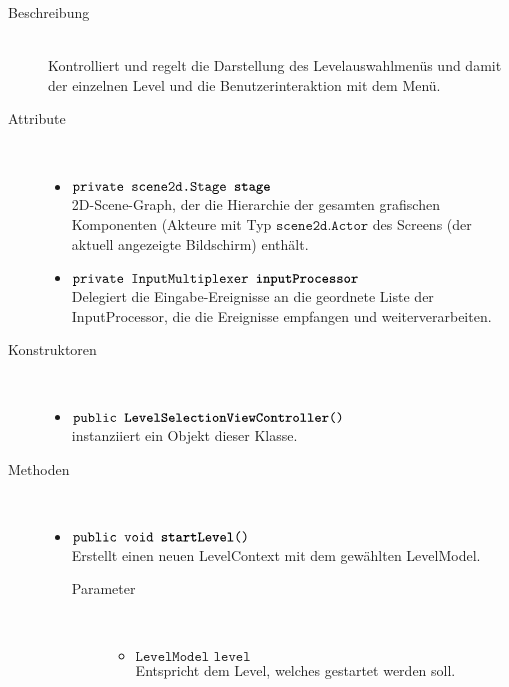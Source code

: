 \begin{description}
\item[Beschreibung] \hfill \\ Kontrolliert und regelt die Darstellung des Levelauswahlmenüs und damit der einzelnen Level und die Benutzerinteraktion mit dem Menü.
\item[Attribute] \hfill \\
	\vspace{-.8cm}
	\begin{itemize}	
		\item $\texttt{private scene2d.Stage \textbf{stage}}$ \\ 2D-Scene-Graph, der die Hierarchie der gesamten grafischen Komponenten (Akteure mit Typ $\texttt{scene2d.Actor}$ des Screens (der aktuell angezeigte Bildschirm) enthält. 
		\item $\texttt{private InputMultiplexer \textbf{inputProcessor}}$ \\ Delegiert die Eingabe-Ereignisse an die geordnete Liste der InputProcessor, die die Ereignisse empfangen und weiterverarbeiten.
		\end{itemize}
	
\item[Konstruktoren] \hfill \\
	\vspace{-.8cm}
	\begin{itemize}
		\item $\texttt{public \textbf{LevelSelectionViewController}()}$ \\ instanziiert ein Objekt dieser Klasse.

	\end{itemize}
	
\item[Methoden] \hfill \\
	\vspace{-.8cm}
	\begin{itemize}
		\item $\texttt{public void \textbf{startLevel}()}$ \\ Erstellt einen neuen LevelContext mit dem gewählten LevelModel.
			\begin{description}
			\item[Parameter] \hfill \\
			\vspace{-.8cm}
			\begin{itemize}
				\item $\texttt{LevelModel level}$ \\ Entspricht dem Level, welches gestartet werden soll.
			\end{itemize}
			\end{description}
			

		\end{itemize}
	\end{description}



